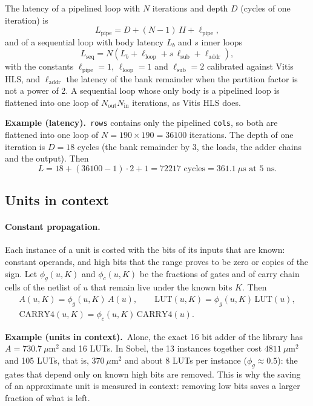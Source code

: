 \documentclass[11pt,a4paper]{article}
\newcommand{\examplebox}[2]{\par\medskip\noindent\colorbox{tabAzul!6}{\begin{minipage}{\dimexpr\linewidth-2\fboxsep}
  \textbf{Example (#1).}\ #2\end{minipage}}\par\medskip}
\begin{document}
The latency of a pipelined loop with $N$ iterations and depth $D$ (cycles of one iteration) is
\[
  L_{\text{pipe}} = D + (N - 1)\, II + \ell_{\text{pipe}},
\]
and of a sequential loop with body latency $L_b$ and $s$ inner loops
\[
  L_{\text{seq}} = N \left( L_b + \ell_{\text{loop}} + s\, \ell_{\text{sub}} + \ell_{\text{addr}} \right),
\]
with the constants $\ell_{\text{pipe}} = 1$, $\ell_{\text{loop}} = 1$ and $\ell_{\text{sub}} = 2$ calibrated against
Vitis HLS, and $\ell_{\text{addr}}$ the latency of the bank remainder when the partition factor is not a power of 2.
A sequential loop whose only body is a pipelined loop is flattened into one loop of $N_{\text{out}} N_{\text{in}}$
iterations, as Vitis HLS does.

\examplebox{latency}{\texttt{rows} contains only the pipelined \texttt{cols}, so both are flattened into one loop of
$N = 190 \times 190 = 36100$ iterations. The depth of one iteration is $D = 18$ cycles (the bank remainder by 3, the
loads, the adder chains and the output). Then
\[
  L = 18 + (36100 - 1) \cdot 2 + 1 = 72217 \text{ cycles} = 361.1\ \mu\text{s at } 5\text{ ns}.
\]}

\subsection{Units in context}\label{sec:context}

\paragraph{Constant propagation.} Each instance of a unit is costed with the bits of its inputs that are known: constant
operands, and high bits that the range proves to be zero or copies of the sign. Let $\phi_g(u, K)$ and $\phi_c(u, K)$
be the fractions of gates and of carry chain cells of the netlist of $u$ that remain live under the known bits $K$.
Then
\begin{gather*}
  A(u, K) = \phi_g(u, K)\, A(u), \qquad \text{LUT}(u, K) = \phi_g(u, K)\, \text{LUT}(u), \\
  \text{CARRY4}(u, K) = \phi_c(u, K)\, \text{CARRY4}(u).
\end{gather*}

\examplebox{units in context}{Alone, the exact 16 bit adder of the library has $A = 730.7\ \mu\text{m}^2$ and 16 LUTs.
In Sobel, the 13 instances together cost $4811\ \mu\text{m}^2$ and 105 LUTs, that is, $370\ \mu\text{m}^2$ and about 8
LUTs per instance ($\phi_g \approx 0.5$): the gates that depend only on known high bits are removed. This is why the
saving of an approximate unit is measured in context: removing low bits saves a larger fraction of what is left.}
\end{document}
